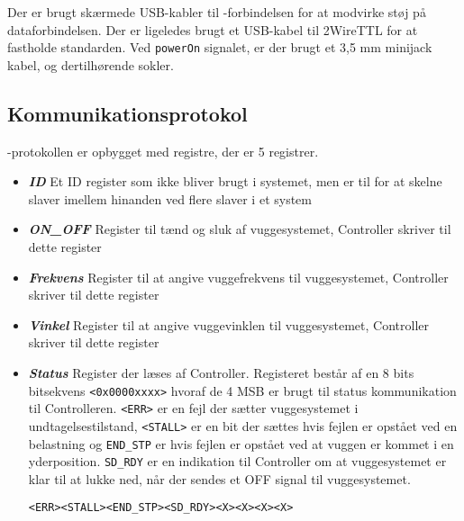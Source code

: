 Der er brugt skærmede USB-kabler til \iic-forbindelsen for at modvirke støj på dataforbindelsen. Der er ligeledes brugt et USB-kabel til 2WireTTL for at fastholde standarden. Ved \verb+powerOn+ signalet, er der brugt et 3,5 mm minijack kabel, og dertilhørende sokler.

\subsection{Kommunikationsprotokol}

\iic-protokollen er opbygget med registre, der er 5 registrer.

\begin{itemize}
\item \textbf{\textit{ID}} Et ID register som ikke bliver brugt i systemet, men er til for at skelne \iic slaver imellem hinanden ved flere slaver i et system
\item \textbf{\textit{ON\_OFF}} Register til tænd og sluk af vuggesystemet, Controller skriver til dette register
\item \textbf{\textit{Frekvens}} Register til at angive vuggefrekvens til vuggesystemet, Controller skriver til dette register
\item \textbf{\textit{Vinkel}} Register til at angive vuggevinklen til vuggesystemet, Controller skriver til dette register
\item \textbf{\textit{Status}} Register der læses af Controller. Registeret består af en 8 bits bitsekvens \verb+<0x0000xxxx>+ hvoraf de 4 MSB er brugt til status kommunikation til Controlleren. \verb+<ERR>+ er en fejl der sætter vuggesystemet i undtagelsestilstand, \verb+<STALL>+ er en bit der sættes hvis fejlen er opstået ved en belastning og \verb+END_STP+ er hvis fejlen er opstået ved at vuggen er kommet i en yderposition. \verb+SD_RDY+ er en indikation til Controller om at vuggesystemet er klar til at lukke ned, når der sendes et OFF signal til vuggesystemet. 
\begin{center}
\verb+<ERR><STALL><END_STP><SD_RDY><X><X><X><X>+
\end{center}
\end{itemize}

